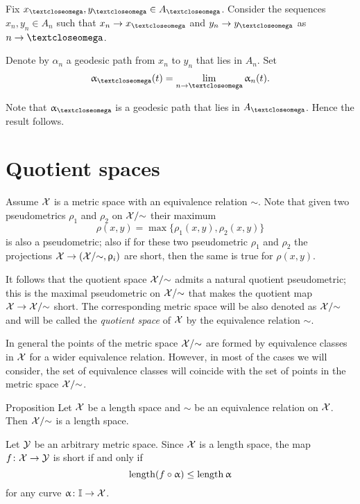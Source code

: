Fix $x_\o,y_\o\in A_\o$.
Consider the sequences $x_n,y_n\in A_n$ such that $x_n\to x_\o$ and $y_n\to y_\o$ as $n\to\o$.

Denote by $\alpha_n$ a geodesic path from $x_n$ to $y_n$ that lies in $A_n$.
Set
\[\alpha_\o(t)=\lim_{n\to \o}\alpha_n(t).\]

Note that $\alpha_\o$ is a geodesic path that lies in $A_\o$.
Hence the result follows.
\qeds






\section{Quotient spaces}\label{sec:quotient}

 Assume $\mathcal{X}$ is a metric space
with an equivalence relation $\sim$.
Note that given two pseudometrics $\rho_1$ and $\rho_2$ on $\mathcal{X}/{\sim}$
their maximum 
\[\rho(x,y)=\max\{\rho_1(x,y),\rho_2(x,y)\}\]
is also a pseudometric;
also if for these two pseudometric $\rho_1$ and $\rho_2$ the projections $\spc{X}\to(\spc{X}/{\sim},\rho_i)$ are short, then the same is true for $\rho(x,y)$.

It follows that 
the quotient space $\mathcal{X}/{\sim}$ admits a natural quotient pseudometric;
this is the maximal pseudometric on  $\mathcal{X}/{\sim}$ 
that makes the quotient map 
$\spc{X}\to\spc{X}/{\sim}$ short.
The corresponding metric space will be also denoted as $\mathcal{X}/{\sim}$
and will be called the \emph{quotient space} of $\mathcal{X}$ by the equivalence relation $\sim$.

In general  the points of the metric space $\mathcal{X}/{\sim}$
are formed by equivalence classes in $\mathcal{X}$
for a wider equivalence relation.
However, in  most of the cases we will consider, 
the set of equivalence classes will coincide with the set of points in the metric space $\mathcal{X}/{\sim}$.



\begin{thm}{Proposition}\label{prop:length-X}
Let $\mathcal{X}$ be a length space and 
$\sim$ be an equivalence relation on $\mathcal{X}$. Then $\mathcal{X}/{\sim}$
is a length space.
\end{thm}

Let $\mathcal{Y}$ be an arbitrary metric space.
Since $\mathcal{X}$ is a length space,
the map $f\:\spc{X}\to \spc{Y}$ is short if and only if 
\[\length(f\circ\alpha)\le \length\alpha\]
for any curve
$\alpha\:\II\to \spc{X}$.

